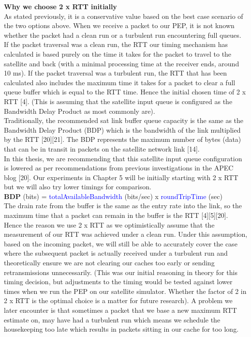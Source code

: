 \documentclass{uathesis}
\begin{document}
\noindent \textbf{Why we choose 2 x RTT initially} \\
As stated previously, it is a conservative value based on the best case scenario of the two options above. When we receive a packet to our PEP, it is not known whether the packet had a clean run or a turbulent run encountering full queues. \\

If the packet traversal was a clean run, the RTT our timing mechanism has calculated is based purely on the time it takes for the packet to travel to the satellite and back (with a minimal processing time at the receiver ends, around 10 ms). If the packet traversal was a turbulent run, the RTT that has been calculated also includes the maximum time it takes for a packet to clear a full queue buffer which is equal to the RTT time. Hence the initial chosen time of 2 x RTT [4]. (This is assuming that the satellite input queue is configured as the Bandwidth Delay Product as most commonly are). \\ 

Traditionally, the recommended sat link buffer queue capacity is the same as the Bandwidth Delay Product (BDP) which is the bandwidth of the link multiplied by the RTT [20][21]. The BDP represents the maximum number of bytes (data) that can be in transit in packets on the satellite network link [14].\\

In this thesis, we are recommending that this satellite input queue configuration is lowered as per recommendations from previous investigations in the APEC blog [20]. Our experiments in Chapter 5 will be initially starting with 2 x RTT but we will also try lower timings for comparison.\\

\textbf{BDP} (bits) = \textcolor{blue}{totalAvailableBandwidth} (bits/sec) x \textcolor{blue}{roundTripTime} (sec) \\

The drain rate from the buffer is the same as the entry rate into the link, so the maximum time that a packet can remain in the buffer is the RTT [4][5][20].\\

Hence the reason we use 2 x RTT as we optimistically assume that the measurement of our RTT was achieved under a clean run. Under this assumption, based on the incoming packet, we will still be able to accurately cover the case where the subsequent packet is actually received under a turbulent run and theoretically ensure we are not clearing our caches too early or sending retransmissions unnecessarily. (This was our initial reasoning in theory for this timing decision, but adjustments to the timing would be tested against lower times when we run the PEP on our satellite simulator. Whether the factor of 2 in 2 x RTT is the optimal choice is a matter for future research). A problem we later encounter is that sometimes a packet that we base a new maximum RTT estimate on, may have had a turbulent run which means we schedule the housekeeping too late which results in packets sitting in our cache for too long. \\
\end{document}
